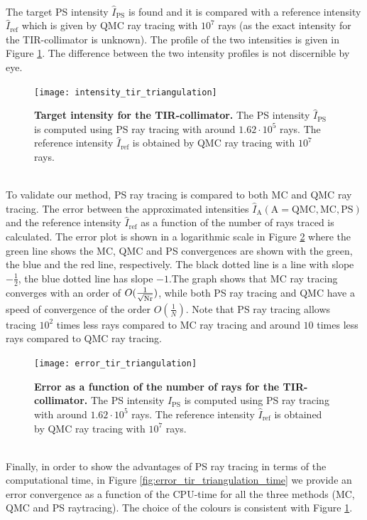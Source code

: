  \\ \indent 
The target PS intensity $\hat{I}_{\textrm{PS}}$ is found and it is compared with a reference intensity $\hat{I}_{\textrm{ref}}$ which is given by QMC ray tracing with $10^7$ rays (as the exact intensity for the TIR-collimator is unknown). The profile of the two intensities is given in Figure \ref{fig:intensity_tir_triangulation}. 
The difference between the two intensity profiles is not discernible by eye.
 \begin{figure}[ht]
  \center
  \texttt{[image: intensity\_tir\_triangulation]}
  \caption{\textbf{Target intensity for the TIR-collimator.} The PS intensity $\hat{I}_{\textrm{PS}}$ is computed using PS ray tracing with around $1.62\cdot 10^5$ rays. The reference intensity $\hat{I}_{\textrm{ref}}$ is obtained by QMC ray tracing with $10^7$ rays.}
  \label{fig:intensity_tir_triangulation}
\end{figure}
\\ \indent
To validate our method, PS ray tracing is compared to both MC and QMC ray tracing. The error between the approximated intensities $\hat{I}_{\textrm{A}} (\textrm{A}=\textrm{QMC}, \textrm{MC}, \textrm{PS})$ and the reference intensity $\hat{I}_{\textrm{ref}}$ as a function of the number of rays traced is calculated. The error plot is shown in a logarithmic scale in Figure \ref{fig:error_tir_triangulation} where the green line shows the MC, QMC and PS convergences are shown with the green, the blue and the red line, respectively. The black dotted line is a line with slope $-\frac{1}{2}$, the blue dotted line has slope $-1$.The graph shows that MC ray tracing converges with an order of $O(\frac{1}{\sqrt{\textrm{Nr}}})$, while both PS ray tracing and QMC have a speed of convergence of the order $O(\frac{1}{N})$. Note that PS ray tracing allows tracing $10^2$ times less rays compared to MC ray tracing and around $10$ times less rays compared to QMC ray tracing.
 \begin{figure}[h!]
  \center
  \texttt{[image: error\_tir\_triangulation]}
  \caption{\textbf{Error as a function of the number of rays for the TIR-collimator.} The PS intensity $\hat{I}_{\textrm{PS}}$ is computed using PS ray tracing with around $1.62\cdot 10^5$ rays. The reference intensity $\hat{I}_{\textrm{ref}}$ is obtained by QMC ray tracing with $10^7$ rays.}
  \label{fig:error_tir_triangulation}
\end{figure}
\\ \indent Finally, in order to show the advantages of PS ray tracing in terms of the computational time, in Figure \ref{fig:error_tir_triangulation_time} we provide an error convergence as a function of the CPU-time for all the three methods (MC, QMC and PS raytracing). The choice of the colours is consistent with Figure \ref{fig:intensity_tir_triangulation}.
